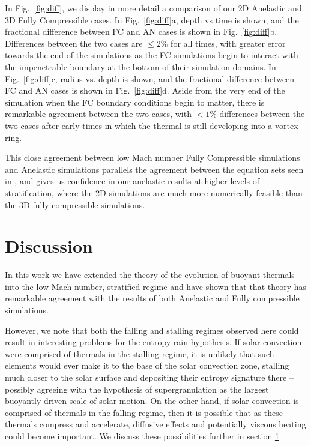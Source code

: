 \documentclass[twocolumn, amsmath, amsfonts, amssymb, trackchanges]{aastex62}
\begin{document}
In Fig.~\ref{fig:diff}, we display in more detail a comparison of our 2D Anelastic and 3D Fully Compressible cases. 
In Fig.~\ref{fig:diff}a, depth vs time is shown, and the fractional difference between FC and AN cases is shown in Fig.~\ref{fig:diff}b.
Differences between the two cases are $\leq 2$\% for all times, with greater error towards the end of the simulations as the FC simulations begin to interact with the impenetrable boundary at the bottom of their simulation domains.  
In Fig.~\ref{fig:diff}c, radius vs. depth is shown, and the fractional difference between FC and AN cases is shown in Fig.~\ref{fig:diff}d. 
Aside from the very end of the simulation when the FC boundary conditions begin to matter, there is remarkable agreement between the two cases, with $< 1$\% differences between the two cases after early times in which the thermal is still developing into a vortex ring.

This close agreement between low Mach number Fully Compressible simulations and Anelastic simulations parallels the agreement between the equation sets seen in \citet{lecoanet&all2014}, and gives us confidence in our anelastic results at higher levels of stratification, where the 2D simulations are much more numerically feasible than the 3D fully compressible simulations.


\section{Discussion}
\label{sec:discussion}
In this work we have extended the theory of the evolution of buoyant thermals into the low-Mach number, stratified regime and have shown that that theory has remarkable agreement with the results of both Anelastic and Fully compressible simulations.

However, we note that both the falling and stalling regimes observed here could result in interesting problems for the entropy rain hypothesis. 
If solar convection were comprised of thermals in the stalling regime, it is unlikely that such elements would ever make it to the base of the solar convection zone, stalling much closer to the solar surface and depositing their entropy signature there -- possibly agreeing with the hypothesis of supergranulation as the largest buoyantly driven scale of solar motion. 
On the other hand, if solar convection is comprised of thermals in the falling regime, then it is possible that as these thermals compress and accelerate, diffusive effects and potentially viscous heating could become important. 
We discuss these possibilities further in section \ref{sec:discussion}
\end{document}
